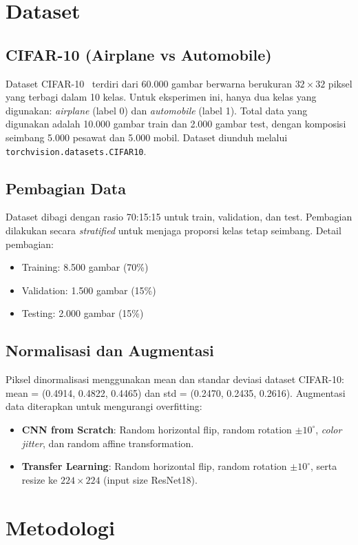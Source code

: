 \documentclass[conference]{IEEEtran}
\begin{document}
\section{Dataset}
\subsection{CIFAR-10 (Airplane vs Automobile)}
Dataset CIFAR-10~\cite{krizhevsky2009} terdiri dari 60.000 gambar berwarna berukuran $32\times32$ piksel yang terbagi dalam 10 kelas. Untuk eksperimen ini, hanya dua kelas yang digunakan: \textit{airplane} (label 0) dan \textit{automobile} (label 1). Total data yang digunakan adalah 10.000 gambar train dan 2.000 gambar test, dengan komposisi seimbang 5.000 pesawat dan 5.000 mobil. Dataset diunduh melalui \texttt{torchvision.datasets.CIFAR10}.

\subsection{Pembagian Data}
Dataset dibagi dengan rasio 70:15:15 untuk train, validation, dan test. Pembagian dilakukan secara \textit{stratified} untuk menjaga proporsi kelas tetap seimbang. Detail pembagian:
\begin{itemize}
\item Training: 8.500 gambar (70\%)
\item Validation: 1.500 gambar (15\%)
\item Testing: 2.000 gambar (15\%)
\end{itemize}

\subsection{Normalisasi dan Augmentasi}
Piksel dinormalisasi menggunakan mean dan standar deviasi dataset CIFAR-10: mean = (0.4914, 0.4822, 0.4465) dan std = (0.2470, 0.2435, 0.2616). Augmentasi data diterapkan untuk mengurangi overfitting:
\begin{itemize}
\item \textbf{CNN from Scratch}: Random horizontal flip, random rotation $\pm 10^\circ$, \textit{color jitter}, dan random affine transformation.
\item \textbf{Transfer Learning}: Random horizontal flip, random rotation $\pm 10^\circ$, serta resize ke $224\times224$ (input size ResNet18).
\end{itemize}

\section{Metodologi}
\end{document}
